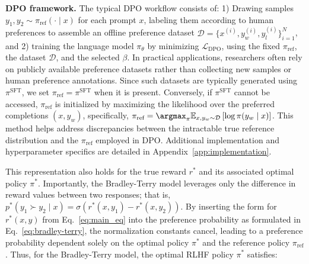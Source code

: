 \textbf{DPO framework.} The typical DPO workflow consists of: 1) Drawing samples $y_1, y_2 \sim \pi_\text{ref}(\cdot \mid x)$ for each prompt $x$, labeling them according to human preferences to assemble an offline preference dataset $\mathcal{D} = \{x^{(i)}, y_w^{(i)}, y_l^{(i)}\}_{i=1}^N$, and 2) training the language model $\pi_\theta$ by minimizing $\mathcal{L}_\text{DPO}$, using the fixed $\pi_\text{ref}$, the dataset $\mathcal{D}$, and the selected $\beta$. 
In practical applications, researchers often rely on publicly available preference datasets rather than collecting new samples or human preference annotations. Since such datasets are typically generated using $\pi^\text{SFT}$, we set $\pi_\text{ref} = \pi^\text{SFT}$ when it is present. Conversely, if $\pi^\text{SFT}$ cannot be accessed, $\pi_\text{ref}$ is initialized by maximizing the likelihood over the preferred completions ${(x, y_w)}$, specifically, ${\pi_\text{ref} = \argmax_{\pi}\mathbb{E}_{x, y_w \sim \mathcal{D}}\left[\log \pi(y_w \mid x)\right]}$. This method helps address discrepancies between the intractable true reference distribution and the $\pi_\text{ref}$ employed in DPO. Additional implementation and hyperparameter specifics are detailed in Appendix~\ref{app:implementation}.

This representation also holds for the true reward $r^*$ and its associated optimal policy $\pi^*$. Importantly, the Bradley-Terry model leverages only the difference in reward values between two responses; that is, ${p^*(y_1 \succ y_2 \mid x) = \sigma(r^*(x, y_1) - r^*(x, y_2))}$. By inserting the form for $r^*(x, y)$ from Eq.~\ref{eq:main_eq} into the preference probability as formulated in Eq.~\ref{eq:bradley-terry}, the normalization constants cancel, leading to a preference probability dependent solely on the optimal policy $\pi^*$ and the reference policy $\pi_\text{ref}$. Thus, for the Bradley-Terry model, the optimal RLHF policy $\pi^*$ satisfies: